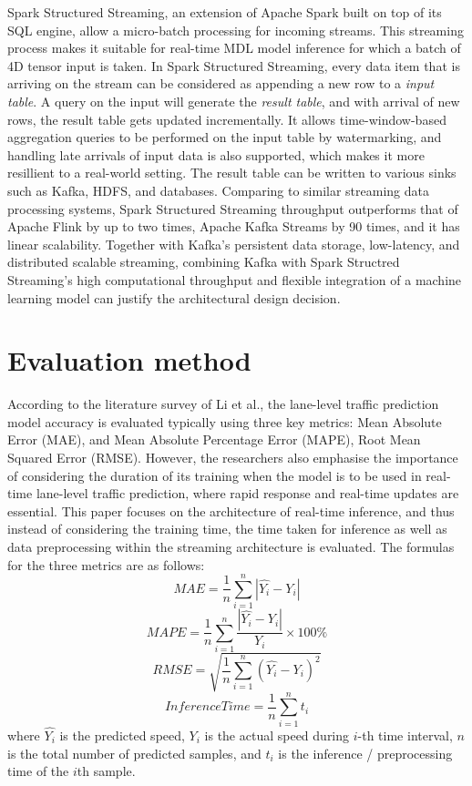 \documentclass[11pt]{uonthesis}
\begin{document}
Spark Structured Streaming\cite{10.1145/3183713.3190664}, an extension of Apache Spark built on top of its SQL engine, allow a micro-batch processing for incoming streams. This streaming process makes it suitable for real-time MDL model inference for which a batch of 4D tensor input is taken. In Spark Structured Streaming, every data item that is arriving on the stream can be considered as appending a new row to a \textit{input table}. A query on the input will generate the \textit{result table}, and with arrival of new rows, the result table gets updated incrementally. It allows time-window-based aggregation queries to be performed on the input table by watermarking, and handling late arrivals of input data is also supported, which makes it more resillient to a real-world setting. The result table can be written to various sinks such as Kafka, HDFS, and databases. Comparing to similar streaming data processing systems, Spark Structured Streaming throughput outperforms that of Apache Flink by up to two times, Apache Kafka Streams by 90 times, and it has linear scalability. Together with Kafka's persistent data storage, low-latency, and distributed scalable streaming, combining Kafka with Spark Structred Streaming's high computational throughput and flexible integration of a machine learning model can justify the architectural design decision. %

\section{Evaluation method}

According to the literature survey of Li et al.\cite{li2024unifyinglaneleveltrafficprediction}, the lane-level traffic prediction model accuracy is evaluated typically using three key metrics: Mean Absolute Error (MAE), and Mean Absolute Percentage Error (MAPE), Root Mean Squared Error (RMSE). However, the researchers also emphasise the importance of considering the duration of its training when the model is to be used in real-time lane-level traffic prediction, where rapid response and real-time updates are essential. This paper focuses on the architecture of real-time inference, and thus instead of considering the training time, the time taken for inference as well as data preprocessing within the streaming architecture is evaluated. The formulas for the three metrics are as follows:
\[ MAE = \frac{1}{n}\sum_{i=1}^{n}|\hat{Y_i} - Y_i| \]
\[ MAPE = \frac{1}{n}\sum_{i=1}^{n}\frac{|\hat{Y_i} - Y_i|}{Y_i} \times 100\% \]
\[ RMSE = \sqrt{\frac{1}{n}\sum_{i=1}^{n}(\hat{Y_i} - Y_i)^2} \]
\[ Inference Time = \frac{1}{n}\sum_{i=1}^{n}t_i \]
where $\hat{Y_i}$ is the predicted speed, $Y_i$ is the actual speed during $i$-th time interval, $n$ is the total number of predicted samples, and $t_i$ is the inference / preprocessing time of the $i$th sample.
\end{document}
